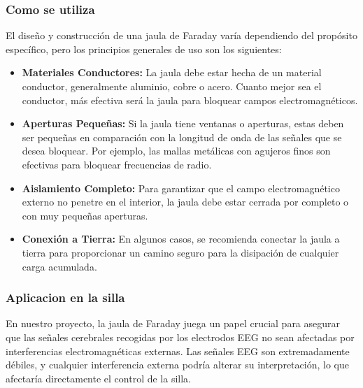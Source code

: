 \documentclass{article}
\begin{document}
\subsubsection{Como se utiliza}
El diseño y construcción de una jaula de Faraday varía dependiendo del propósito específico, pero los principios generales de uso son los siguientes:
\begin{itemize}
    \item \textbf{Materiales Conductores:} La jaula debe estar hecha de un material conductor, generalmente aluminio, cobre o acero. Cuanto mejor sea el conductor, más efectiva será la jaula para bloquear campos electromagnéticos.
    \item \textbf{Aperturas Pequeñas:} Si la jaula tiene ventanas o aperturas, estas deben ser pequeñas en comparación con la longitud de onda de las señales que se desea bloquear. Por ejemplo, las mallas metálicas con agujeros finos son efectivas para bloquear frecuencias de radio.
    \item \textbf{Aislamiento Completo:} Para garantizar que el campo electromagnético externo no penetre en el interior, la jaula debe estar cerrada por completo o con muy pequeñas aperturas.
    \item \textbf{Conexión a Tierra:} En algunos casos, se recomienda conectar la jaula a tierra para proporcionar un camino seguro para la disipación de cualquier carga acumulada.
\end{itemize}

\subsubsection{Aplicacion en la silla}
En nuestro proyecto, la jaula de Faraday juega un papel crucial para asegurar que las señales cerebrales recogidas por los electrodos EEG no sean afectadas por interferencias electromagnéticas externas. Las señales EEG son extremadamente débiles, y cualquier interferencia externa podría alterar su interpretación, lo que afectaría directamente el control de la silla. 
\end{document}
